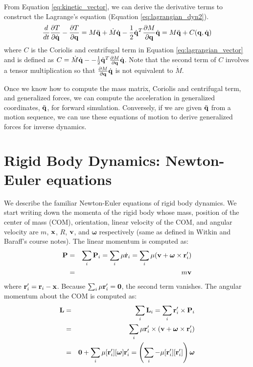 From Equation \ref{eq:kinetic_vector}, we can derive the derivative
terms to construct the Lagrange's equation (Equation
\ref{eq:lagrangian_dyn2}).
\begin{equation}
\frac{d}{dt}\frac{\partial T}{\partial \dot{\mathbf{q}}} - \frac{\partial
  T}{\partial \mathbf{q}} = M\ddot{\mathbf{q}} + \dot{M} \dot{\mathbf{q}} - \frac{1}{2}\dot{\mathbf{q}}^T \frac{\partial M}{\partial \mathbf{q}} \dot{\mathbf{q}} = M
\ddot{\mathbf{q}} + C(\mathbf{q}, \dot{\mathbf{q}})
\end{equation}
where $C$ is the Coriolis and centrifugal term in Equation
\ref{eq:lagrangian_vector} and is defined as $C = \dot{M}
\dot{\mathbf{q}} - - \frac{1}{2}\dot{\mathbf{q}}^T \frac{\partial M}{\partial
  \mathbf{q}} \dot{\mathbf{q}}$. Note that the second term of $C$ involves a
tensor multiplication so that $\frac{\partial M}{\partial
  \mathbf{q}} \dot{\mathbf{q}}$ is not equivalent to $\dot{M}$.

Once we know how to compute the mass matrix, Coriolis and centrifugal
term, and generalized forces, we can compute the acceleration in
generalized coordinates, $\ddot{\mathbf{q}}$, for forward
simulation. Conversely, if we are given $\ddot{\mathbf{q}}$ from a motion
sequence, we can use these equations of motion to derive generalized
forces for inverse dynamics. 

\section{Rigid Body Dynamics: Newton-Euler equations}
We describe the familiar Newton-Euler equations of rigid body dynamics. We start writing down the
momenta of the rigid body whose mass, position of the center
of mass (COM), orientation,
linear velocity of the COM, and angular velocity are $m$, $\mathbf{x}$, $R$,
$\mathbf{v}$, and $\bm{\omega}$ respectively (same as defined in Witkin and
Baraff's course notes). The linear momentum  is computed as:
\begin{eqnarray}
\mathbf{P} &=& \sum_i \mathbf{P}_i = \sum_i \mathbf{\mu} \dot{\mathbf{r}}_i = \sum_i  \mathbf{\mu} (\mathbf{v} + \bm{\omega}
    \times \mathbf{r}_i') \nonumber \\
 &=& m \mathbf{v}
\end{eqnarray}
where $\mathbf{r}_i' = \mathbf{r}_i - \mathbf{x}$. Because $\sum_i \mathbf{\mu}
\mathbf{r}_i' = \mathbf{0}$, the second term vanishes. The angular momentum  about the COM is computed as:
\begin{eqnarray}
\nonumber
\mathbf{L} & = & \sum_i \mathbf{L}_i  = \sum_i \mathbf{r}_i' \times \mathbf{P}_i\\
\nonumber
& = & \sum_i \mathbf{\mu} \mathbf{r}_i' \times (\mathbf{v} + \bm{\omega} \times \mathbf{r}_i')\\
&= & \mathbf{0} + \sum_i \mathbf{\mu} [\mathbf{r}_i'][\bm{\omega}]\mathbf{r}_i' = \left ( \sum_i -\mathbf{\mu} [\mathbf{r}_i'][\mathbf{r}_i'] \right )\bm{\omega}
\end{eqnarray}

